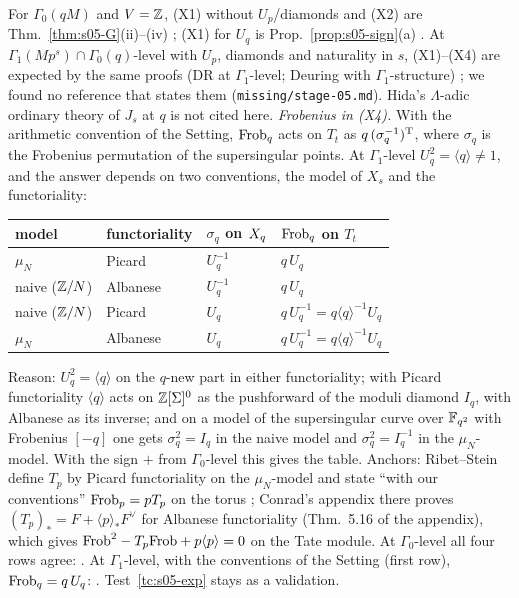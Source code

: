 \begin{remark}\label{rem:s05-Xstatus}
For $\Gamma_0(qM)$ and $V=\mathbb{Z}$, (X1) without $U_p$/diamonds and (X2) are Thm.~\ref{thm:s05-G}(ii)--(iv) \stcited; (X1) for
$U_q$ is Prop.~\ref{prop:s05-sign}(a) \stpmc. At $\Gamma_1(Mp^s)\cap\Gamma_0(q)$-level with $U_p$, diamonds and naturality in $s$,
(X1)--(X4) are expected by the same proofs (DR at $\Gamma_1$-level; Deuring with $\Gamma_1$-structure) \stexp; we found no
reference that states them (\texttt{missing/stage-05.md}). Hida's $\Lambda$-adic ordinary theory of $J_s$ at $q$ is not cited here.
\emph{Frobenius in (X4).} With the arithmetic convention of the Setting, $\mathrm{Frob}_q$ acts on $T_t$ as $q\,(\sigma_q^{-1})^{\rm T}$,
where $\sigma_q$ is the Frobenius permutation of the supersingular points. At $\Gamma_1$-level $U_q^2=\langle q\rangle\ne1$, and the
answer depends on two conventions, the model of $X_s$ and the functoriality:
\begin{center}\small
\begin{tabular}{@{}llll@{}}
\toprule
model & functoriality & $\sigma_q$ on $X_q$ & $\mathrm{Frob}_q$ on $T_t$\\\midrule
$\mu_N$ & Picard & $U_q^{-1}$ & $q\,U_q$\\
naive ($\mathbb{Z}/N$) & Albanese & $U_q^{-1}$ & $q\,U_q$\\
naive ($\mathbb{Z}/N$) & Picard & $U_q$ & $q\,U_q^{-1}=q\langle q\rangle^{-1}U_q$\\
$\mu_N$ & Albanese & $U_q$ & $q\,U_q^{-1}=q\langle q\rangle^{-1}U_q$\\
\bottomrule
\end{tabular}
\end{center}
Reason: $U_q^2=\langle q\rangle$ on the $q$-new part in either functoriality; with Picard functoriality $\langle q\rangle$ acts on
$\mathbb{Z}[\Sigma]^0$ as the pushforward of the moduli diamond $I_q$, with Albanese as its inverse; and on a model of the supersingular
curve over $\mathbb{F}_{q^2}$ with Frobenius $[-q]$ one gets $\sigma_q^2=I_q$ in the naive model and $\sigma_q^2=I_q^{-1}$ in the
$\mu_N$-model. With the sign $+$ from $\Gamma_0$-level this gives the table. Anchors: Ribet--Stein define $T_p$ by Picard
functoriality on the $\mu_N$-model and state ``with our conventions'' $\mathrm{Frob}_p=pT_p$ on the torus
; Conrad's appendix
there proves $(T_p)_*=F+\langle p\rangle_*F^\vee$ for Albanese functoriality (Thm.~5.16 of the appendix), which gives
$\mathrm{Frob}^2-T_p\mathrm{Frob}+p\langle p\rangle=0$ on the Tate module. At $\Gamma_0$-level all four rows agree: \stpmc. At $\Gamma_1$-level,
with the conventions of the Setting (first row), $\mathrm{Frob}_q=q\,U_q$: \stexp. Test~\ref{tc:s05-exp} stays as a validation.
\end{remark}

